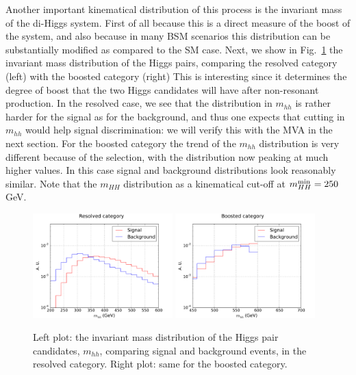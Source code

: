 Another important kinematical distribution of this process is the invariant mass
of the di-Higgs system.
%
First of all because this is a direct measure of the boost of the system,
and also because in many BSM scenarios this distribution can be substantially
modified as compared to the SM case.
%
Next, we show in
Fig.~\ref{fig:mhh} the invariant mass distribution of the Higgs pairs,
comparing the resolved category (left) with the boosted category (right)
%
This is interesting since it determines the degree of boost that the two
Higgs candidates will have after non-resonant production.
%
In the resolved case, we see that the distribution
in $m_{hh}$ is rather harder for the signal as for the background,
and thus one expects that cutting in $m_{hh}$ would help signal
discrimination: we will verify this with the MVA in the next section.
%
For the boosted category the trend of the $m_{hh}$ distribution
is very different because of the selection, with the
distribution now peaking at much higher values.
%
In this case signal and background distributions
look reasonably similar.
%
Note that the $m_{HH}$ distribution as a kinematical
cut-off at $m_{HH}^{\rm min}=250$ GeV.


\begin{figure}[t]
\begin{center}
  \includegraphics[width=0.48\textwidth]{plots/m_HH_res_C1.pdf}
  \includegraphics[width=0.48\textwidth]{plots/m_HH_boost_C1.pdf}
  \caption{\small Left plot: the invariant mass distribution of the Higgs
    pair candidates, $m_{hh}$, comparing signal and background events,
    in the resolved category.
    Right plot: same for the boosted category.
}
\label{fig:mhh}
\end{center}
\end{figure}






